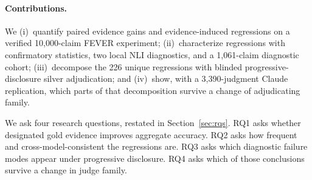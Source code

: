 \paragraph{Contributions.}
We (i)~quantify paired evidence gains and evidence-induced regressions on a verified 10{,}000-claim FEVER experiment;
(ii)~characterize regressions with confirmatory statistics, two local NLI diagnostics, and a 1{,}061-claim diagnostic cohort;
(iii)~decompose the 226 unique regressions with blinded progressive-disclosure silver adjudication; and
(iv)~show, with a 3{,}390-judgment Claude replication, which parts of that decomposition survive a change of adjudicating family.

We ask four research questions, restated in Section~\ref{sec:rqs}.
RQ1 asks whether designated gold evidence improves aggregate accuracy.
RQ2 asks how frequent and cross-model-consistent the regressions are.
RQ3 asks which diagnostic failure modes appear under progressive disclosure.
RQ4 asks which of those conclusions survive a change in judge family.
